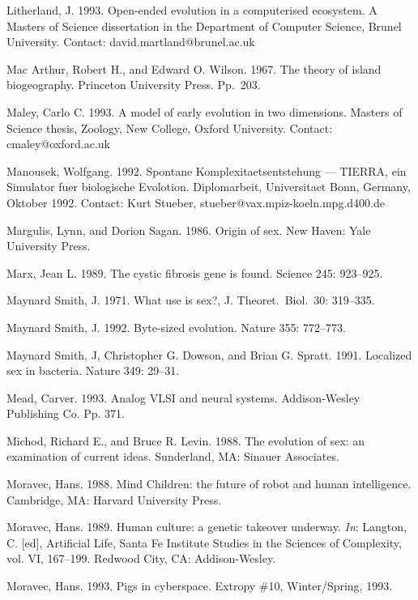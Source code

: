 \begin{thebibliography}{99}
Litherland, J.  1993.  Open-ended evolution in a computerised ecosystem.
A Masters of Science dissertation in the Department of Computer Science,
Brunel University.  Contact: david.martland@brunel.ac.uk

Mac Arthur, Robert H., and Edward O. Wilson.  1967.  The theory of
island biogeography.  Princeton University Press.  Pp.\ 203.

Maley, Carlo C.  1993.  A model of early evolution in two dimensions.
Masters of Science thesis, Zoology, New College, Oxford University.
Contact: cmaley@oxford.ac.uk

Manousek, Wolfgang.  1992.  Spontane Komplexitaetsentstehung --- TIERRA,
ein Simulator fuer biologische Evolotion.  Diplomarbeit, Universitaet
Bonn, Germany, Oktober 1992.  Contact: Kurt Stueber,
stueber@vax.mpiz-koeln.mpg.d400.de

Margulis, Lynn, and Dorion Sagan.  1986.  Origin of sex.
New Haven: Yale University Press.

Marx, Jean L.  1989.  The cystic fibrosis gene is found.  Science 245:
923--925.

Maynard Smith, J.  1971.  What use is sex?,  J. Theoret.\ Biol.\ 30:
319--335.

Maynard Smith, J.  1992.  Byte-sized evolution.  Nature 355: 772--773.

Maynard Smith, J, Christopher G. Dowson, and Brian G. Spratt.  1991.
Localized sex in bacteria.  Nature 349: 29--31.

Mead, Carver.  1993.  Analog VLSI and neural systems.  Addison-Wesley
Publishing Co.  Pp. 371.

Michod, Richard E., and Bruce R. Levin.  1988.  The evolution of sex:
an examination of current ideas.  Sunderland, MA: Sinauer Associates.

Moravec, Hans.  1988.  Mind Children: the future of robot and human
intelligence.  Cambridge, MA: Harvard University Press.

Moravec, Hans.  1989.  Human culture: a genetic takeover underway.
{\em In\/}: Langton, C. [ed], Artificial Life, Santa Fe Institute
Studies in the Sciences of Complexity, vol. VI, 167--199.
Redwood City, CA: Addison-Wesley.

Moravec, Hans.  1993.  Pigs in cyberspace.
Extropy \#10, Winter/Spring, 1993.


\end{thebibliography}
